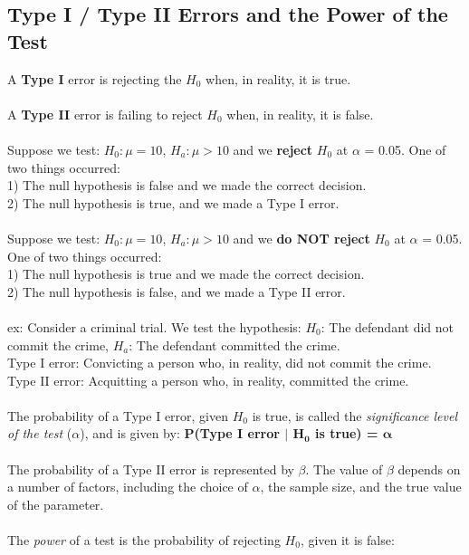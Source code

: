 \documentclass[12pt, a4paper]{article}
\begin{document}
	\subsection{Type I / Type II Errors and the Power of the Test}
	A \textbf{Type I} error is rejecting the $H_0$ when, in reality, it is true. \\~\\
	A \textbf{Type II} error is failing to reject $H_0$ when, in reality, it is false. \\~\\
	Suppose we test: $H_0 : \mu = 10$, $H_a: \mu > 10$ and we \textbf{reject} $H_0$ at $\alpha$ = 0.05. One of two things occurred: \\
	1) The null hypothesis is false and we made the correct decision. \\
	2) The null hypothesis is true, and we made a Type I error. \\~\\
	Suppose we test: $H_0 : \mu = 10$, $H_a: \mu > 10$ and we \textbf{do NOT reject} $H_0$ at $\alpha$ = 0.05. One of two things occurred: \\
	1) The null hypothesis is true and we made the correct decision. \\
	2) The null hypothesis is false, and we made a Type II error. \\~\\
	ex: Consider a criminal trial. We test the hypothesis: $H_0$: The defendant did not commit the crime, $H_a$: The defendant committed the crime. \\
	Type I error: Convicting a person who, in reality, did not commit the crime. \\
	Type II error: Acquitting a person who, in reality, committed the crime. \\~\\
	The probability of a Type I error, given $H_0$ is true, is called the \textit{significance level of the test} ($\alpha$), and is given by: \textbf{P(Type I error $|$ $\bm{H_0}$ is true) = $\bm{\alpha}$} \\~\\
	The probability of a Type II error is represented by $\beta$. The value of $\beta$ depends on a number of factors, including the choice of $\alpha$, the sample size, and the true value of the parameter. \\~\\
	The \textit{power} of a test is the probability of rejecting $H_0$, given it is false: \\
\end{document}
